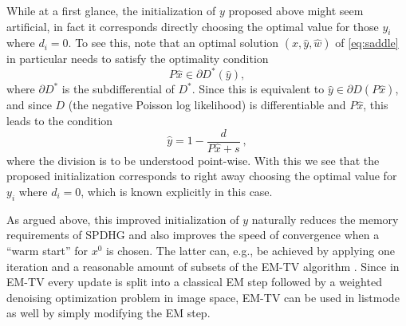 While at a first glance, the initialization of $y$ proposed above might seem artificial, in fact it corresponds directly choosing the optimal value for those $y_i$ where $d_i=0$. To see this, note that an optimal solution $(\hat{x},\hat{y},\hat{w})$ of \eqref{eq:saddle}  in particular needs to satisfy the optimality condition
\begin{equation}
P \hat{x} \in  \partial D^*(\hat{y}),
\end{equation}
where $\partial D^*$ is the subdifferential of $D^*$. Since this is equivalent to $\hat{y} \in  \partial D(P \hat{x})$, and since $D$ (the negative Poisson log likelihood) is differentiable and $P\hat{x}$, this leads
to the condition
\begin{equation}
\hat{y} = 1 - \frac{d}{P\hat{x} + s} \ ,
\label{eq:yinit}
\end{equation}
where the division is to be understood point-wise. With this we see that the proposed initialization corresponds to right away choosing the optimal value for $y_i $ where $d_i=0$, which is known explicitly in this case.

As argued above, this improved initialization of $y$ naturally reduces the 
memory requirements of SPDHG and also improves the speed of convergence when a
``warm start'' for $x^0$ is chosen. 
The latter can, e.g., be achieved by applying one iteration
and a reasonable amount of subsets of the EM-TV algorithm \cite{Sawatzky2008, Burger2008}.
Since in EM-TV every update is split into a classical EM step followed by a weighted denoising
optimization problem in image space, EM-TV can be used in listmode as well by simply
modifying the EM step.

